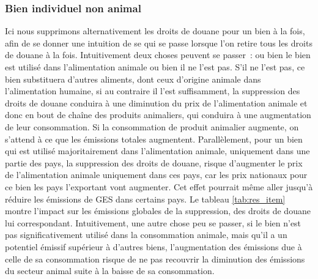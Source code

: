 \subsubsection{Bien individuel non animal}

Ici nous supprimons alternativement les droits de douane pour un bien à la fois, afin de se donner une intuition de se qui se passe lorsque l'on retire tous les droits de douane à la fois. Intuitivement deux choses peuvent se passer~: ou bien le bien est utilisé dans l'alimentation animale ou bien il ne l'est pas. S'il ne l'est pas, ce bien substituera d'autres aliments, dont ceux d'origine animale dans l'alimentation humaine, si au contraire il l'est suffisamment, la suppression des droits de douane conduira à une diminution du prix de l'alimentation animale et donc en bout de chaîne des produits animaliers, qui conduira à une augmentation de leur consommation. Si la consommation de produit animalier augmente, on s'attend à ce que les émissions totales augmentent. Parallèlement, pour un bien qui est utilisé majoritairement dans l'alimentation animale, uniquement dans une partie des pays, la suppression des droits de douane, risque d'augmenter le prix de l'alimentation animale uniquement dans ces pays, car les prix nationaux pour ce bien les pays l'exportant vont augmenter. Cet effet pourrait même aller jusqu'à réduire les émissions de GES dans certains pays. Le tableau \ref{tab:res_item} montre l'impact sur les émissions globales de la suppression, des droits de douane lui correspondant. Intuitivement, une autre chose peu se passer, si le bien n'est pas significativement utilisé dans la consommation animale, mais qu'il a un potentiel émissif supérieur à d'autres biens, l'augmentation des émissions due à celle de sa consommation risque de ne pas recouvrir la diminution des émissions du secteur animal suite à la baisse de sa consommation.

